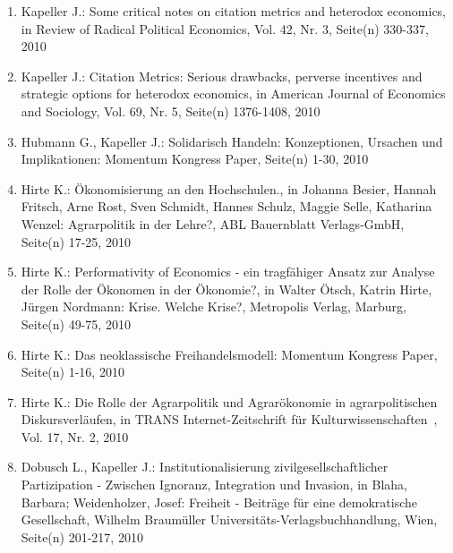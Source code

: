 \begin{enumerate}
	 \item Kapeller J.: Some critical notes on citation metrics and heterodox economics, in Review of Radical Political Economics, Vol. 42, Nr. 3, Seite(n) 330-337, 2010
	 \item Kapeller J.: Citation Metrics: Serious drawbacks, perverse incentives and strategic options for heterodox economics, in American Journal of Economics and Sociology, Vol. 69, Nr. 5, Seite(n) 1376-1408, 2010
	 \item Hubmann G., Kapeller J.: Solidarisch Handeln: Konzeptionen, Ursachen und Implikationen: Momentum Kongress Paper, Seite(n) 1-30, 2010
	 \item Hirte K.: Ökonomisierung an den Hochschulen., in Johanna Besier, Hannah Fritsch, Arne Rost, Sven Schmidt, Hannes Schulz, Maggie Selle, Katharina Wenzel: Agrarpolitik in der Lehre?, ABL Bauernblatt Verlags-GmbH, Seite(n) 17-25, 2010
	 \item Hirte K.: Performativity of Economics - ein tragfähiger Ansatz zur Analyse der Rolle der Ökonomen in der Ökonomie?, in Walter Ötsch, Katrin Hirte, Jürgen Nordmann: Krise. Welche Krise?, Metropolis Verlag, Marburg, Seite(n) 49-75, 2010
	 \item Hirte K.: Das neoklassische Freihandelsmodell: Momentum Kongress Paper, Seite(n) 1-16, 2010
	 \item Hirte K.: Die Rolle der Agrarpolitik und Agrarökonomie in agrarpolitischen Diskursverläufen, in TRANS Internet-Zeitschrift für Kulturwissenschaften , Vol. 17, Nr. 2, 2010
	 \item Dobusch L., Kapeller J.: Institutionalisierung zivilgesellschaftlicher Partizipation - Zwischen Ignoranz, Integration und Invasion, in Blaha, Barbara; Weidenholzer, Josef: Freiheit - Beiträge für eine demokratische Gesellschaft, Wilhelm Braumüller Universitäts-Verlagsbuchhandlung, Wien, Seite(n) 201-217, 2010
\end{enumerate}
